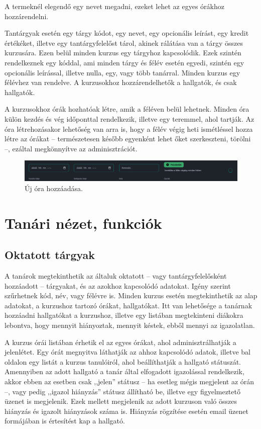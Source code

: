 \documentclass[
]{thesis-ekf}
\theoremstyle{definition}
\theoremstyle{remark}
\begin{document}
A termeknél elegendő egy nevet megadni, ezeket lehet az egyes órákhoz hozzárendelni.

Tantárgyak esetén egy tárgy kódot, egy nevet, egy opcionális leírást, egy kredit értékéket, illetve egy tantárgyfelelőst tárol, akinek rálátása van a tárgy összes kurzusára. Ezen belül minden kurzus egy tárgyhoz kapcsolódik. Ezek szintén rendelkeznek egy kóddal, ami minden tárgy és félév esetén egyedi, szintén egy opcionális leírással, illetve nulla, egy, vagy több tanárral. Minden kurzus egy félévhez van rendelve. A kurzusokhoz hozzárendelhetők a hallgatók, és csak hallgatók.

A kurzusokhoz órák hozhatóak létre, amik a féléven belül lehetnek. Minden óra külön kezdés és vég időponttal rendelkezik, illetve egy teremmel, ahol tartják. Az óra létrehozásakor lehetőség van arra is, hogy a félév végig heti ismétléssel hozza létre az órákat -- természetesen később egyenként lehet őket szerkeszteni, törölni --, ezáltal megkönnyítve az adminisztrációt.

\begin{figure}[ht!]
	\centering
	\includegraphics[width=15cm]{../pictures/screenshots/newclass.png}
	\caption{Új óra hozzáadása.}
	\label{newclass}
\end{figure}


\section{Tanári nézet, funkciók}

\subsection{Oktatott tárgyak}
\label{taugthClass}

A tanárok megtekinthetik az általuk oktatott -- vagy tantárgyfelelősként hozzáadott -- tárgyakat, és az azokhoz kapcsolódó adatokat. Igény szerint szűrhetnek kód, név, vagy félévre is. Minden kurzus esetén megtekinthetik az alap adatokat, a kurzushoz tartozó órákat, hallgatókat. Itt van lehetősége a tanárnak hozzáadni hallgatókat a kurzushoz, illetve egy listában megtekinteni diákokra lebontva, hogy mennyit hiányoztak, mennyit késtek, ebből mennyi az igazolatlan.

A kurzus órái listában érhetik el az egyes órákat, ahol adminisztrálhatják a jelenlétet. Egy órát megnyitva láthatják az ahhoz kapcsolódó adatok, illetve bal oldalon egy listát a kurzus tanulóiról, ahol beállíthatják a hallgató státuszát. Amennyiben az adott hallgató a tanár által elfogadott igazolással rendelkezik, akkor ebben az esetben csak ,,jelen'' státusz -- ha esetleg mégis megjelent az órán --, vagy pedig ,,igazol hiányzás'' státusz állítható be, illetve egy figyelmeztető üzenet is megjelenik. Ezek mellett megjelenik az adott kurzuson való összes hiányzás és igazolt hiányzások száma is. Hiányzás rögzítése esetén email üzenet formájában is értesítést kap a hallgató.
\end{document}
